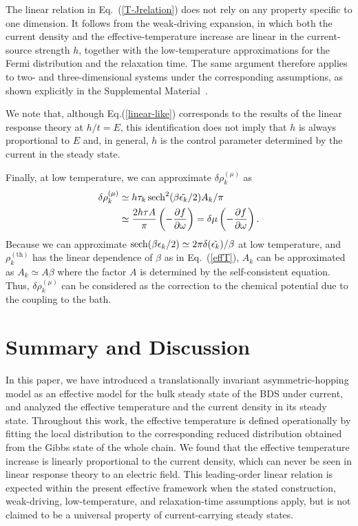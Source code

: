 \documentclass[a4paper, amsfonts, amssymb, amsmath, reprint, showkeys, nofootinbib, twoside,superscriptaddress, prb]{revtex4-2}
\newcommand{\mr}[1]{\mathrm{#1}}
\newcommand{\epk}{\epsilon_k}
\newcommand{\p}{\partial}
\begin{document}
The linear relation in Eq.~(\ref{T-Jrelation}) does not rely on any property specific to one dimension. It follows from the weak-driving expansion, in which both the current density and the effective-temperature increase are linear in the current-source strength $h$, together with the low-temperature approximations for the Fermi distribution and the relaxation time. The same argument therefore applies to two- and three-dimensional systems under the corresponding assumptions, as shown explicitly in the Supplemental Material~\cite{Supple}.

We note that, although Eq.(\ref{linear-like}) corresponds to the results of the linear response theory at $h/t = E$, this identification does not imply that $h$ is always proportional to $E$ and, in general, $h$ is the control parameter determined by the current in the steady state.

Finally, at low temperature, we can approximate $\delta\rho_k^{(\mu)}$ as 
\begin{align}
    \delta\rho_k^{(\mu)} &\simeq h\tau_k\sech^2(\beta\tilde{\epk}/2)A_k/\pi\\
    & \simeq \frac{2h\tau A}{\pi} \left(-\frac{\p f}{\p\omega}\right) = \delta\mu\left(-\frac{\p f}{\p\omega}\right).\label{eff_mu}
\end{align}
Because we can approximate $\sech(\beta\epk/2)\simeq 2\pi \delta(\tilde{\epk})/\beta$ at low temperature, and $\rho^{(\mr{th})}_k$ has the linear dependence of $\beta$ as in Eq.~(\ref{effT}), $A_k$ can be approximated as $A_k \simeq A\beta$ where the factor $A$ is determined by the self-consistent equation. Thus, $\delta\rho_k^{(\mu)}$ can be considered as the correction to the chemical potential due to the coupling to the bath.


\section{Summary and Discussion}
In this paper, we have introduced a translationally invariant asymmetric-hopping model as an effective model for the bulk steady state of the BDS under current, and analyzed the effective temperature and the current density in its steady state.
Throughout this work, the effective temperature is defined operationally by fitting the local distribution to the corresponding reduced distribution obtained from the Gibbs state of the whole chain.
We found that the effective temperature increase is linearly proportional to the current density, which can never be seen in linear response theory to an electric field. This leading-order linear relation is expected within the present effective framework when the stated construction, weak-driving, low-temperature, and relaxation-time assumptions apply, but is not claimed to be a universal property of current-carrying steady states.
\end{document}

